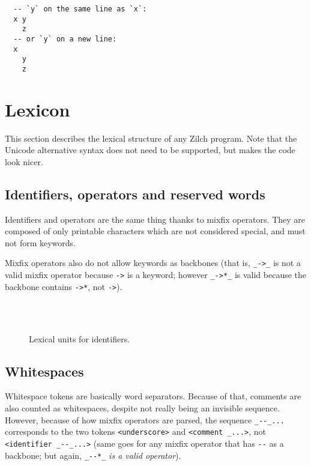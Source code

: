 \noindent\begin{verbatim}
  -- `y` on the same line as `x`:
  x y
    z
  -- or `y` on a new line:
  x
    y
    z
\end{verbatim}

\section{Lexicon}\label{sec:zilch-grammar-lexical}

This section describes the lexical structure of any Zilch program.
Note that the Unicode alternative syntax does not need to be supported, but makes the code look nicer.

\subsection{Identifiers, operators and reserved words}\label{subsec:zilch-grammar-lexical-identifiers}

Identifiers and operators are the same thing thanks to mixfix operators.
They are composed of only printable characters which are not considered special, and must not form keywords.

Mixfix operators also do not allow keywords as backbones (that is, \texttt{\_->\_} is not a valid mixfix operator because \texttt{->} is a keyword; however \texttt{\_->*\_} is valid because the backbone contains \texttt{->*}, not \texttt{->}).

\begin{figure}[H]
  \centering

  \\
  \\

  \caption{Lexical units for identifiers.}
  \label{fig:zilch-grammar-lexical-identifiers-grammar}
\end{figure}

\subsection{Whitespaces}\label{subsec:zilch-grammar-lexical-whitespaces}

Whitespace tokens are basically word separators.
Because of that, comments are also counted as whitespaces, despite not really being an invisible sequence.
However, because of how mixfix operators are parsed, the sequence \verb|_--_...| corresponds to the two tokens \verb|<underscore>| and \verb|<comment _...>|, not \verb|<identifier _--_...>| (same goes for any mixfix operator that has \verb|--| as a backbone; but again, \verb|_--*_| \textit{is a valid operator}).

